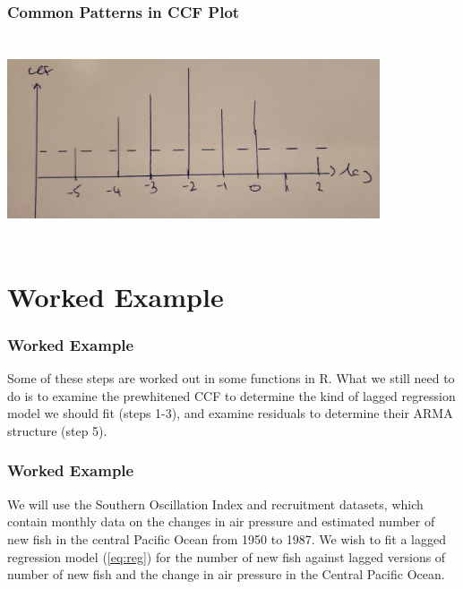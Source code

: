 \documentclass[%
xcolor=pdftex]{beamer}
\begin{document}
\begin{frame}
\frametitle{Common Patterns in CCF Plot}

\includegraphics[width=110mm, height=60mm]{slide25.jpg}

\end{frame}






\section{Worked Example}
\frame{\tableofcontents[currentsection]}

\begin{frame}
\frametitle{Worked Example}

Some of these steps are worked out in some functions in R. What we still need to do is to examine the prewhitened CCF to determine the kind of lagged regression model we should fit (steps 1-3), and examine residuals to determine their ARMA structure (step 5).


\end{frame}

\begin{frame}
\frametitle{Worked Example}

We will use the Southern Oscillation Index and recruitment datasets, which contain monthly data on the changes in air pressure and estimated number of new fish in the central Pacific Ocean from 1950 to 1987. We wish to fit a lagged regression model (\ref{eq:reg}) for the number of new fish against lagged versions of number of new fish and the change in air pressure in the Central Pacific Ocean. 

\end{frame}
\end{document}

